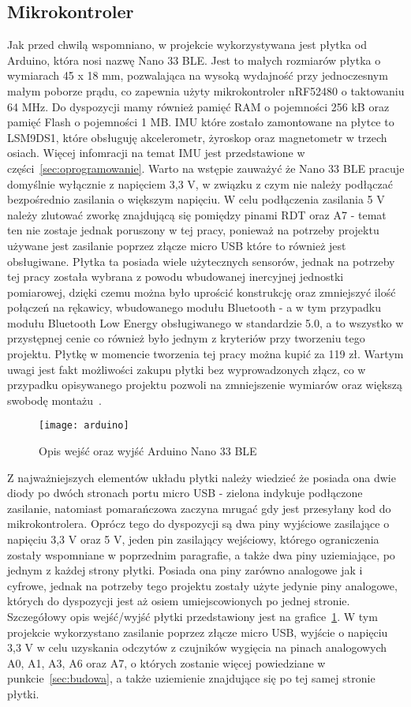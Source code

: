 	
	\subsection{Mikrokontroler}
	\label{subsec:arduino}
	Jak przed chwilą wspomniano, w projekcie wykorzystywana jest płytka od Arduino, która nosi nazwę Nano 33 BLE. Jest to małych rozmiarów płytka o  wymiarach 45 x 18 mm, pozwalająca na wysoką wydajność przy jednoczesnym małym poborze prądu, co zapewnia użyty mikrokontroler nRF52480 o taktowaniu 64 MHz. Do dyspozycji mamy również pamięć RAM o pojemności 256 kB oraz pamięć Flash o pojemności 1 MB. IMU które zostało zamontowane na płytce to LSM9DS1, które obsługuję akcelerometr, żyroskop oraz magnetometr w trzech osiach. Więcej infomracji na temat IMU jest przedstawione w części~\ref{sec:oprogramowanie}. Warto na wstępie zauważyć że Nano 33 BLE pracuje domyślnie wyłącznie z napięciem 3,3 V, w związku z czym nie należy podłączać bezpośrednio zasilania o większym napięciu. W celu podłączenia zasilania 5 V należy zlutować zworkę znajdującą się pomiędzy pinami RDT oraz A7 - temat ten nie zostaje jednak poruszony w tej pracy, ponieważ na potrzeby projektu używane jest zasilanie poprzez złącze micro USB które to również jest obsługiwane. Płytka ta posiada wiele użytecznych sensorów, jednak na potrzeby tej pracy została wybrana z powodu wbudowanej inercyjnej jednostki pomiarowej, dzięki czemu można było uprościć konstrukcję   oraz zmniejszyć ilość połączeń na rękawicy, wbudowanego modułu Bluetooth - a w tym przypadku modułu Bluetooth Low Energy obsługiwanego w standardzie 5.0, a to wszystko w przystępnej cenie co również było jednym z kryteriów przy tworzeniu tego projektu. Płytkę w momencie tworzenia tej pracy można kupić za 119 zł. Wartym uwagi jest fakt możliwości zakupu płytki bez wyprowadzonych złącz, co w przypadku opisywanego projektu pozwoli na zmniejszenie wymiarów oraz większą swobodę montażu~\cite{botland-arduino}.
\begin{figure}[h]
\centering
\texttt{[image: arduino]}
\caption{Opis wejść oraz wyjść Arduino Nano 33 BLE~\cite{a1}}
\label{fig:arduino}
\end{figure}
	
	Z najważniejszych elementów układu płytki należy wiedzieć że posiada ona dwie diody po dwóch stronach portu micro USB - zielona indykuje podłączone zasilanie, natomiast pomarańczowa zaczyna mrugać gdy jest przesyłany kod do mikrokontrolera. Oprócz tego do dyspozycji są dwa piny wyjściowe zasilające o napięciu 3,3 V oraz 5 V, jeden pin zasilający wejściowy, którego ograniczenia zostały wspomniane w poprzednim paragrafie, a także dwa piny uziemiające, po jednym z każdej strony płytki. Posiada ona piny zarówno analogowe jak i cyfrowe, jednak na potrzeby tego projektu zostały użyte jedynie piny analogowe, których do dyspozycji jest aż osiem umiejscowionych po jednej stronie. Szczegółowy opis wejść/wyjść płytki przedstawiony jest na grafice~\ref{fig:arduino}. W tym projekcie wykorzystano zasilanie poprzez złącze micro USB, wyjście o napięciu 3,3 V w celu uzyskania odczytów z czujników wygięcia na pinach analogowych A0, A1, A3, A6 oraz A7, o których zostanie więcej powiedziane w punkcie~\ref{sec:budowa}, a także uziemienie znajdujące się po tej samej stronie płytki.

